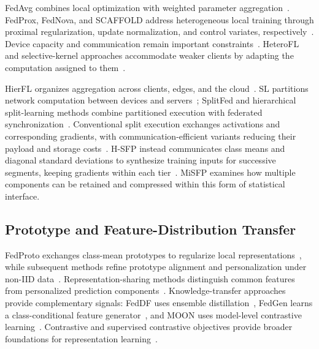 FedAvg combines local optimization with weighted parameter aggregation~\cite{pmlr-v54-mcmahan17a}. FedProx, FedNova, and SCAFFOLD address heterogeneous local training through proximal regularization, update normalization, and control variates, respectively~\cite{li2020federated,10.5555/3495724.3496362,pmlr-v119-karimireddy20a}. Device capacity and communication remain important constraints~\cite{MAL-083,9084352}. HeteroFL and selective-kernel approaches accommodate weaker clients by adapting the computation assigned to them~\cite{diao2021heterofl,niu2023overcoming}.

HierFL organizes aggregation across clients, edges, and the cloud~\cite{9148862,9488756,rana2022hierarchical}. SL partitions network computation between devices and servers~\cite{GUPTA20181,vepakomma2019split}; SplitFed and hierarchical split-learning methods combine partitioned execution with federated synchronization~\cite{thapa2022splitfed,quan2023hiersfl,10980018}. Conventional split execution exchanges activations and corresponding gradients, with communication-efficient variants reducing their payload and storage costs~\cite{11091500,zhang2025amperecommunicationefficienthighaccuracysplit}. H-SFP instead communicates class means and diagonal standard deviations to synthesize training inputs for successive segments, keeping gradients within each tier~\cite{tran2026h}. MiSFP examines how multiple components can be retained and compressed within this form of statistical interface.

\subsection{Prototype and Feature-Distribution Transfer}

FedProto exchanges class-mean prototypes to regularize local representations~\cite{tan2022fedproto}, while subsequent methods refine prototype alignment and personalization under non-IID data~\cite{10660707,bensiah2025feddpa}. Representation-sharing methods distinguish common features from personalized prediction components~\cite{collins2021exploiting}. Knowledge-transfer approaches provide complementary signals: FedDF uses ensemble distillation~\cite{lin2020ensemble}, FedGen learns a class-conditional feature generator~\cite{zhu2021data}, and MOON uses model-level contrastive learning~\cite{9578660}. Contrastive and supervised contrastive objectives provide broader foundations for representation learning~\cite{chen2020simple,khosla2020supervised}.

